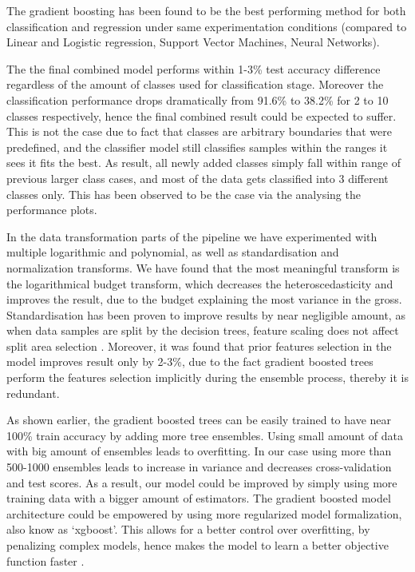 The gradient boosting has been found to be the best performing method for both classification and regression under same experimentation conditions (compared to Linear and Logistic regression, Support Vector Machines, Neural Networks). 

The the final combined model performs within 1-3\% test accuracy difference regardless of the amount of classes used for classification stage. Moreover the classification performance drops dramatically from 91.6\% to 38.2\% for 2 to 10 classes respectively, hence the final combined result could be expected to suffer. This is not the case due to fact that classes are arbitrary boundaries that were predefined, and the classifier model still classifies samples within the ranges it sees it fits the best. As result, all newly added classes simply fall within range of previous larger class cases, and most of the data gets classified into 3 different classes only. This has been observed to be the case via the analysing the performance plots.

In the data transformation parts of the pipeline we have experimented with multiple logarithmic and polynomial, as well as standardisation and  normalization transforms. We have found that the most meaningful transform  is the logarithmical budget transform, which decreases the heteroscedasticity and improves the result, due to the budget explaining the most variance in the gross. Standardisation has been proven to improve results by near negligible  amount, as when data samples are split by the decision trees, feature scaling does not affect split area selection \cite{chen2014introduction}. Moreover, it was found that prior features selection in the model improves result only by  2-3\%, due to the fact gradient boosted trees perform the features selection implicitly during the ensemble process, thereby it is redundant.

As shown earlier, the gradient boosted trees can be easily trained to have near 100\% train accuracy by adding more tree ensembles. Using small amount of data with big amount of ensembles leads to overfitting. In our case using more than 500-1000 ensembles leads to increase in variance and decreases cross-validation and  test scores. As a result, our model could be improved by simply using more training data with a bigger amount of estimators. The gradient boosted model architecture could be empowered by using more regularized model formalization, also know as ‘xgboost’. This allows for a better control over overfitting, by penalizing complex models, hence makes the model to learn a better objective function faster \cite{chen2015}.  

